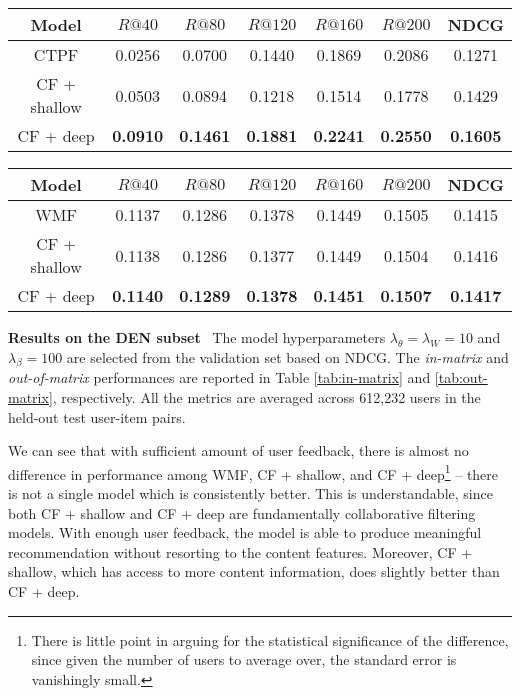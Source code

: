 \begin{table*}
\centering
  \begin{tabular}{ c | c  c  c  c c  | c  }
    \hline
    Model & $R@40$  & $R@80$  & $R@120$  & $R@160$ & $R@200$ & NDCG \\ \hline
     CTPF \cite{gopalan2014content} &  0.0256 &  0.0700  &  0.1440  & 0.1869  &  0.2086 & 0.1271 \\
     CF + shallow & 0.0503 & 0.0894 & 0.1218 & 0.1514 & 0.1778 & 0.1429\\
     CF + deep & \bf{0.0910} & \bf{0.1461} & \bf{0.1881} & \bf{0.2241} & \bf{0.2550} & \bf{0.1605} \\
    \hline
  \end{tabular}
  \caption{\emph{Out-of-matrix} performance on the DEN subset with proposed and competing methods.} 
  \label{tab:out-matrix}
\end{table*}

\begin{table*}
\centering
  \begin{tabular}{ c | c  c  c  c c  | c  }
    \hline
    Model & $R@40$  & $R@80$  & $R@120$  & $R@160$ & $R@200$ & NDCG \\ \hline
     WMF \cite{hu2008collaborative} &  0.1137 &   0.1286 & 0.1378 &   0.1449 &  0.1505 & 0.1415\\
     CF + shallow & 0.1138 &  0.1286 &  0.1377 &  0.1449 &  0.1504 & 0.1416 \\
     CF + deep & \bf{0.1140} & \bf{0.1289} & \bf{0.1378} & \bf{0.1451} & \bf{0.1507} & \bf{0.1417} \\
    \hline
  \end{tabular}
  \caption{\emph{In-matrix} performance on the SPR subset with proposed and competing methods.} 
  \label{tab:spr}
\end{table*}

\vspace{0.1in}
\noindent\textbf{Results on the {DEN} subset}~
The model hyperparameters $\lambda_\theta =  \lambda_W = 10$ and $\lambda_\beta = 100$ are selected from the validation set based on NDCG. The \emph{in-matrix} and \emph{out-of-matrix} performances are reported in Table \ref{tab:in-matrix} and \ref{tab:out-matrix}, respectively. All the metrics are averaged across 612,232 users in the held-out test user-item pairs.

We can see that with sufficient amount of user feedback, there is almost no difference in performance among WMF, CF + shallow, and CF + deep\footnote{There is little point in arguing for the statistical significance of the difference, since given the number of users to average over, the standard error is vanishingly small.} -- there is not a single model which is consistently better. This is understandable, since both CF + shallow and CF + deep are fundamentally collaborative filtering models. With enough user feedback, the model is able to produce meaningful recommendation without resorting to the content features. Moreover, CF + shallow, which has access to more content information, does slightly better than CF + deep.

